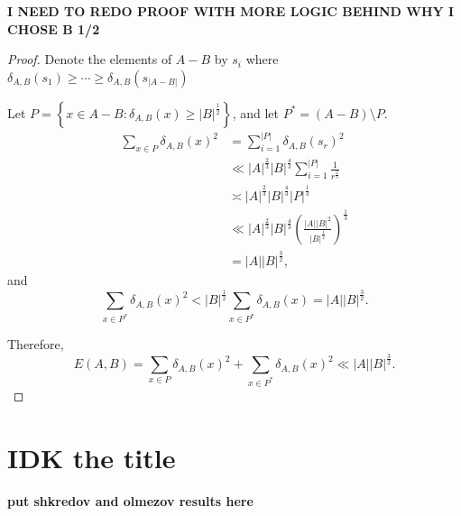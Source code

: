 \documentclass[12pt]{amsart}
\begin{document}
\textbf{I NEED TO REDO PROOF WITH MORE LOGIC BEHIND WHY I CHOSE B 1/2}
\begin{proof}
Denote the elements of \(A-B\) by \(s_{i} \) where \(\delta_{A,B} (s_1) \geq \cdots \geq \delta_{A,B} (s _{\left\lvert A-B \right\rvert } )\)

Let \(P = \left\{ x \in A - B : \delta_{A,B} (x) \geq \left\lvert B \right\rvert ^{\frac{1}{2} } \right\} \), and let \(P ^{*} = \left( A - B \right) \setminus P\).
\begin{align*}
    \sum _{x \in P} \delta_{A,B} (x)^{2} & =  \sum_{i=1}^{\left\lvert P \right\rvert } \delta_{A,B} (s _{r} )^{2}\\
    & \ll \left\lvert A \right\rvert ^{\frac{2}{3} } \left\lvert B \right\rvert ^{\frac{4}{3} } \sum_{i=1}^{\left\lvert P \right\rvert } \frac{1}{r^{\frac{2}{3} }} \\
    & \asymp \left\lvert A \right\rvert ^{\frac{2}{3} } \left\lvert B \right\rvert ^{\frac{4}{3} } \left\lvert P \right\rvert ^{\frac{1}{3} }\\
    & \ll \left\lvert A \right\rvert ^{\frac{2}{3} } \left\lvert B \right\rvert ^{\frac{4}{3} } \left( \frac{\left\lvert A \right\rvert \left\lvert B \right\rvert ^{2}}{\left\lvert B \right\rvert ^{\frac{1}{2} }}  \right) ^{\frac{1}{3} }\\
    & = \left\lvert A \right\rvert \left\lvert B \right\rvert ^{\frac{3}{2} },
\end{align*}
and
\[
    \sum _{x \in P^{*}} \delta_{A,B} (x)^{2} < \left\lvert B \right\rvert ^{\frac{1}{2} } \sum _{x \in P^{*}} \delta_{A,B} (x) = \left\lvert A \right\rvert \left\lvert B \right\rvert ^{\frac{3}{2} }
.\]

Therefore,
\[
    E(A,B) = \sum _{x \in P} \delta_{A,B} (x)^{2} + \sum _{x \in P ^{*}} \delta_{A,B} (x)^{2} \ll \left\lvert A \right\rvert \left\lvert B \right\rvert ^{\frac{3}{2} } 
.\]
\end{proof}

\section{ \textbf{IDK the title }}
\textbf{put shkredov and olmezov results here}
\end{document}
